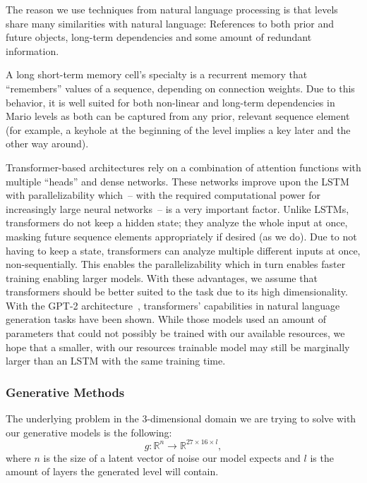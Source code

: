 The reason we use techniques from natural language processing is that
levels share many similarities with natural language: References to
both prior and future objects, long-term dependencies and some amount
of redundant information.

A long short-term memory cell's specialty is a recurrent memory that
``remembers'' values of a sequence, depending on connection weights.
Due to this behavior, it is well suited for both non-linear and
long-term dependencies in Mario levels as both can be captured from
any prior, relevant sequence element (for example, a keyhole at the
beginning of the level implies a key later and the other way around).

Transformer-based architectures rely on a combination of attention
functions with multiple ``heads'' and dense networks. These networks
improve upon the LSTM with parallelizability which~-- with the required
computational power for increasingly large neural networks~-- is a very
important factor. Unlike LSTMs, transformers do not keep a hidden
state; they analyze the whole input at once, masking future sequence
elements appropriately if desired (as we do). Due to not having to
keep a state, transformers can analyze multiple different inputs at
once, non-sequentially. This enables the parallelizability which in
turn enables faster training enabling larger models. With these
advantages, we assume that transformers should be better suited to the
task due to its high dimensionality. With the \mbox{GPT-2}
architecture~\cite{radfordLanguageModelsAre}, transformers'
capabilities in natural language generation tasks have been shown.
While those models used an amount of parameters that could not
possibly be trained with our available resources, we hope that a
smaller, with our resources trainable model may still be marginally
larger than an LSTM with the same training time.

\subsubsection{Generative Methods}

The underlying problem in the 3-dimensional domain we are trying to
solve with our generative models is the following:
\begin{equation*}
  g: \mathbb{R}^{n} \to \mathbb{R}^{27 \times 16 \times l},
\end{equation*}
where $n$ is the size of a latent vector of noise our model expects
and $l$ is the amount of layers the generated level will contain.


